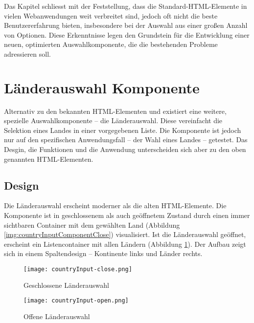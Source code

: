 Das Kapitel schliesst mit der Feststellung, dass die Standard-HTML-Elemente in vielen Webanwendungen weit verbreitet sind, jedoch oft nicht die beste Benutzererfahrung bieten, insbesondere bei der Auswahl aus einer großen Anzahl von Optionen. 
Diese Erkenntnisse legen den Grundstein für die Entwicklung einer neuen, optimierten Auswahlkomponente, die die bestehenden Probleme adressieren soll.



\section{Länderauswahl Komponente}
\label{sec:countryChoice}

Alternativ zu den bekannten HTML-Elementen  und  existiert eine weitere, spezielle Auswahlkomponente – die Länderauswahl\citemarktext{
    [\cite{ip5}]
}.
Diese vereinfacht die Selektion eines Landes in einer vorgegebenen Liste. 
Die Komponente ist jedoch nur auf den spezifischen Anwendungsfall – der Wahl eines Landes – getestet.
Das Desgin, die Funktionen und die Anwendung unterscheiden sich aber zu den oben genannten HTML-Elementen.

\subsection{Design}
\label{sec:countryChoiceDesign}

Die Länderauswahl erscheint moderner als die alten HTML-Elemente.
Die Komponente ist in geschlossenem als auch geöffnetem Zustand durch einen immer sichtbaren Container mit dem gewählten Land (Abbildung \ref{img:countryInputComponentClose}) visualisiert.
Ist die Länderauswahl geöffnet, erscheint ein Listencontainer mit allen Ländern (Abbildung \ref{img:countryInputComponentOpen}).
Der Aufbau zeigt sich in einem Spaltendesign – Kontinente links und Länder rechts.

\begin{figure}[!htb]
    \centering
    \begin{minipage}[b]{0.5\textwidth}
        \centering
        \texttt{[image: countryInput-close.png]}
        \caption{Geschlossene Länderauswahl}
        \label{img:countryInputComponentClose}
    \end{minipage}
    \hfill
    \begin{minipage}[b]{0.45\textwidth}
        \centering
        \texttt{[image: countryInput-open.png]}
        \caption{Offene Länderauswahl}
        \label{img:countryInputComponentOpen}
    \end{minipage}
\end{figure}

